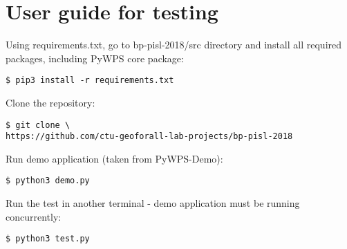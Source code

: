\chapter{User guide for testing} \label{testing}
\label{user-guide}


Using requirements.txt, go to bp-pisl-2018/src directory and install
all required packages, including PyWPS core package:
\begin{lstlisting}
$ pip3 install -r requirements.txt
\end{lstlisting}


\noindent Clone the repository:

\begin{lstlisting}
$ git clone \
https://github.com/ctu-geoforall-lab-projects/bp-pisl-2018
\end{lstlisting}

\noindent Run demo application (taken from PyWPS-Demo):

\begin{lstlisting}
$ python3 demo.py
\end{lstlisting}

\noindent Run the test in another terminal - demo application must be
running concurrently:

\begin{lstlisting}
$ python3 test.py
\end{lstlisting}






%
%
%
%
%




